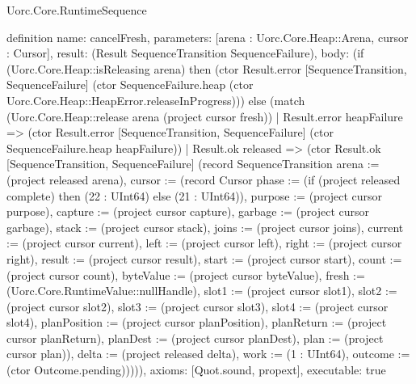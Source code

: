 \begin{lexlean}{Uorc.Core.RuntimeSequence}
\begin{semanticmodule}
definition{
  name: cancelFresh,
  parameters: [arena : Uorc.Core.Heap::Arena, cursor : Cursor],
  result: (Result SequenceTransition SequenceFailure),
  body: (if (Uorc.Core.Heap::isReleasing arena) then (ctor Result.error [SequenceTransition, SequenceFailure] (ctor SequenceFailure.heap (ctor Uorc.Core.Heap::HeapError.releaseInProgress))) else (match (Uorc.Core.Heap::release arena (project cursor fresh))
    | Result.error heapFailure => (ctor Result.error [SequenceTransition, SequenceFailure] (ctor SequenceFailure.heap heapFailure))
    | Result.ok released => (ctor Result.ok [SequenceTransition, SequenceFailure] (record SequenceTransition {arena := (project released arena), cursor := (record Cursor {phase := (if (project released complete) then (22 : UInt64) else (21 : UInt64)), purpose := (project cursor purpose), capture := (project cursor capture), garbage := (project cursor garbage), stack := (project cursor stack), joins := (project cursor joins), current := (project cursor current), left := (project cursor left), right := (project cursor right), result := (project cursor result), start := (project cursor start), count := (project cursor count), byteValue := (project cursor byteValue), fresh := (Uorc.Core.RuntimeValue::nullHandle), slot1 := (project cursor slot1), slot2 := (project cursor slot2), slot3 := (project cursor slot3), slot4 := (project cursor slot4), planPosition := (project cursor planPosition), planReturn := (project cursor planReturn), planDest := (project cursor planDest), plan := (project cursor plan)}), delta := (project released delta), work := (1 : UInt64), outcome := (ctor Outcome.pending)})))),
  axioms: [Quot.sound, propext],
  executable: true
}


\end{semanticmodule}
\end{lexlean}
